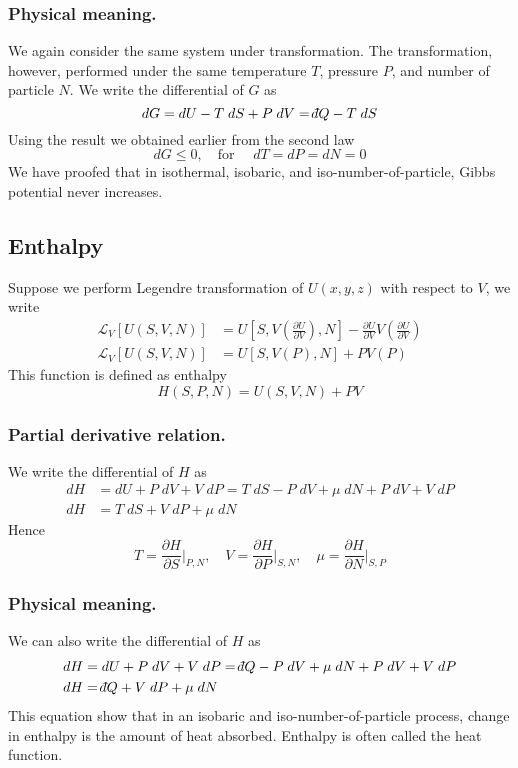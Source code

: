 \documentclass[../../../Main.tex]{subfiles}
\begin{document}
\subsubsection*{Physical meaning.} We again consider the same system under transformation. The transformation, however, performed under the same temperature $T$, pressure $P$, and number of particle $N$. We write the differential of $G$ as 
\begin{equation*}
    dG=dU-T\;dS+P\;dV=\dbar Q-T\;dS
\end{equation*}
Using the result we obtained earlier from the second law
\begin{equation*}
    dG \leq0, \quad \text{for }\quad dT=dP=dN=0
\end{equation*}
We have proofed that in isothermal, isobaric, and iso-number-of-particle, Gibbs potential never increases.
\subsection*{Enthalpy}
Suppose we perform Legendre transformation of $U(x,y,z)$ with respect to $V$, we write 
\begin{align*}
    \mathcal{L}_V\left[U(S,V,N)\right]&= U\left[S,V\left(\frac{\partial U}{\partial V}\right),N\right]- \frac{\partial U}{\partial V}V\left(\frac{\partial U}{\partial V}\right) \\
    \mathcal{L}_V\left[U(S,V,N)\right]&=U\left[S,V(P),N\right]+PV(P)
\end{align*}
This function is defined as enthalpy
\begin{equation*}
    H(S,P,N)=U(S,V,N)+PV
\end{equation*}
\subsubsection*{Partial derivative relation.} We write the differential of $H$ as
\begin{align*}
    dH&=dU+P\;dV+V\;dP=T\;dS-P\;dV+\mu\;dN+P\;dV+V\;dP\\
    dH&=T\;dS+V\;dP+\mu\;dN
\end{align*}
Hence
\begin{equation*}
    T=\frac{\partial H}{\partial S}\bigg|_{P,N}, \quad V=\frac{\partial H}{\partial P}\bigg|_{S,N},\quad \mu=\frac{\partial H}{\partial N}\bigg|_{S,P}
\end{equation*}

\subsubsection*{Physical meaning.} We can also write the differential of $H$ as 
\begin{align*}
    dH&=dU+P\;dV+V\;dP=\dbar Q-P\;dV+\mu\;dN+P\;dV+V\;dP\\
    dH&=\dbar Q+V\;dP+\mu\;dN
\end{align*}
This equation show that in an isobaric and iso-number-of-particle process, change in enthalpy is the amount of heat absorbed. Enthalpy is often called the heat function.
\end{document}
